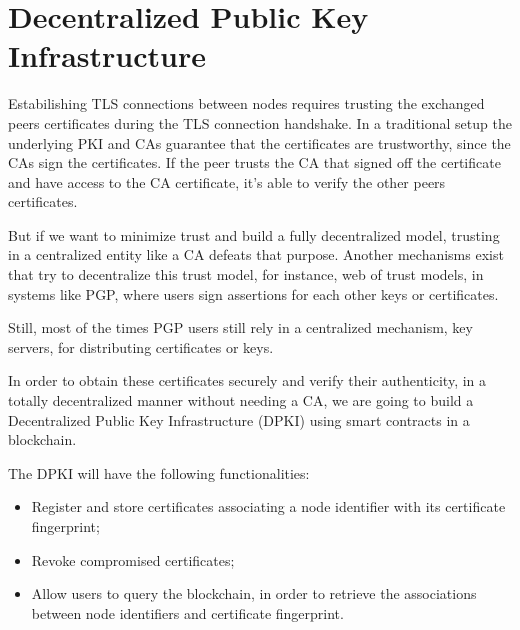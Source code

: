 

\section{Decentralized Public Key Infrastructure} \label{ssec:blockchain}

Estabilishing \ac{TLS} connections between nodes requires trusting the exchanged peers certificates during the \ac{TLS} connection handshake.
In a traditional setup the underlying \ac{PKI} and \acp{CA} guarantee that the certificates are trustworthy, since the \acp{CA} sign the certificates.
If the peer trusts the \ac{CA} that signed off the certificate and have access to the \ac{CA} certificate, it's able to verify the other peers certificates.

But if we want to minimize trust and build a fully decentralized model, trusting in a centralized entity like a \ac{CA} defeats that purpose.
Another mechanisms exist that try to decentralize this trust model, for instance, web of trust models, in systems like \ac{PGP}, where users sign assertions for each other keys or certificates.

Still, most of the times \ac{PGP} users still rely in a centralized mechanism, key servers, for distributing certificates or keys.

In order to obtain these certificates securely and verify their authenticity, in a totally decentralized manner without needing a CA, we are going to build a Decentralized Public Key Infrastructure (DPKI) using smart contracts in a blockchain.

The DPKI will have the following functionalities:
\begin{itemize}
	\item Register and store certificates associating a node identifier with its certificate fingerprint;
	\item Revoke compromised certificates;
	\item Allow users to query the blockchain, in order to retrieve the associations between node identifiers and certificate fingerprint.
\end{itemize}

